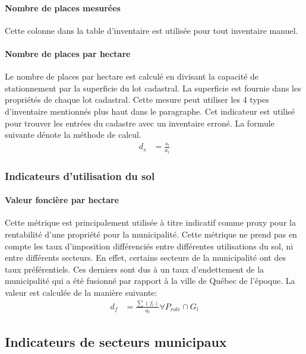             \paragraph{Nombre de places mesurées} Cette colonne dans la table d'inventaire est utilisée pour tout inventaire manuel.  
            
            \paragraph{Nombre de places par hectare} Le nombre de places par hectare est calculé en divisant la capacité de stationnement par la superficie du lot cadastral. La superficie est fournie dans les propriétés de chaque lot cadastral. Cette mesure peut utiliser les 4 types d'inventaire mentionnés plus haut dans le paragraphe. Cet indicateur est utilisé pour trouver les entrées du cadastre avec un inventaire erroné. La formule suivante dénote la méthode de calcul. 
            \begin{align}
                d_s &= \frac{s_l}{a_l} 
            \end{align}
        \subsubsection{Indicateurs d'utilisation du sol}
            \paragraph{Valeur foncière par hectare}
        Cette métrique est principalement utilisée à titre indicatif comme proxy pour la rentabilité d'une propriété pour la municipalité. Cette métrique ne prend pas en compte les taux d'imposition différenciés entre différentes utilisations du sol, ni entre différents secteurs. En effet, certains secteurs de la municipalité ont des taux préférentiels. Ces derniers sont dus à un taux d'endettement de la municipalité qui a été fusionné par rapport à la ville de Québec de l'époque. La valeur est calculée de la manière suivante:
        \begin{align}
            d_f &= \frac{\sum{\left(f_l\right)} }{a_l}\forall P_{role}\cap G_l
        \end{align}
    \subsection{Indicateurs de secteurs municipaux} \label{ssec:indicateurs-secteurs-municipaux}
